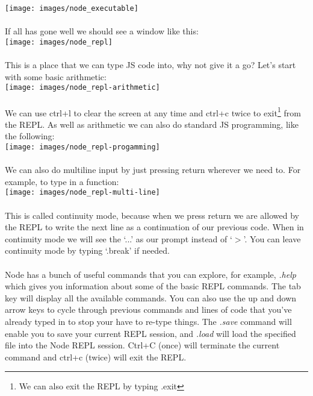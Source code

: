 \documentclass[10pt, a4paper, twosize]{article}
\begin{document}
\texttt{[image: images/node\_executable]}

\paragraph{} If all has gone well we should see a window like this:\\

\texttt{[image: images/node\_repl]}

\paragraph{} This is a place that we can type JS code into, why not give it a go? Let's start with some basic arithmetic:\\

\texttt{[image: images/node\_repl-arithmetic]}

\paragraph{} We can use ctrl+l to clear the screen at any time and ctrl+c twice to exit\footnote{We can also exit the REPL by typing .exit} from the REPL. As well as arithmetic we can also do standard JS programming, like the following:\\

\texttt{[image: images/node\_repl-progamming]}

\paragraph{} We can also do multiline input by just pressing return wherever we need to. For example, to type in a function:\\

\texttt{[image: images/node\_repl-multi-line]}

\paragraph{} This is called continuity mode, because when we press return we are allowed by the REPL to write the next line as a continuation of our previous code. When in continuity mode we will see the `...' as our prompt instead of `$>$'. You can leave continuity mode by typing `.break' if needed.

\paragraph{} Node has a bunch of useful commands that you can explore, for example, \emph{.help} which gives you information about some of the basic REPL commands. The tab key will display all the available commands. You can also use the up and down arrow keys to cycle through previous commands and lines of code that you've already typed in to stop your have to re-type things. The \emph{.save} command will enable you to save your current REPL session, and \emph{.load} will load the specified file into the Node REPL session. Ctrl+C (once) will terminate the current command and ctrl+c (twice) will exit the REPL.
\end{document}
